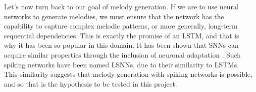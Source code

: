 \documentclass[../../report.tex]{subfiles}
\begin{document}
Let's now turn back to our goal of melody generation. If we are to use neural
networks to generate melodies, we must ensure that the network has the
capability to capture complex melodic patterns, or more generally, long-term
sequential dependencies. This is exactly the promise of an LSTM, and that is why
it has been so popular in this domain. It has been shown that SNNs can acquire
similar properties through the inclusion of neuronal adaptation
\cite{Bellec2018LSNN}. Such spiking networks have been named LSNNs, due to their
similarity to LSTMs. This similarity suggests that melody generation with
spiking networks is possible, and so that is the hypothesis to be tested in this
project.
\end{document}
